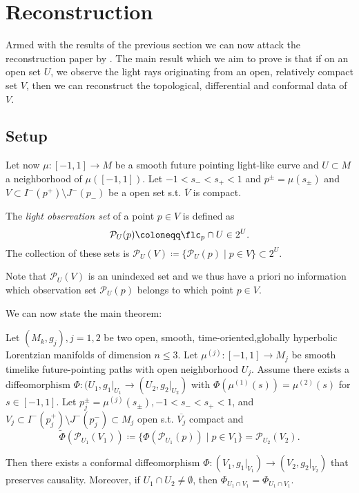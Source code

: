 \section{Reconstruction}
Armed with the results of the previous section we can now attack the reconstruction paper by \citet{kurylev2017inverse}.
The main result which we aim to prove is that if on an open set $U$, we observe the light rays originating from an open, relatively compact set $V$, then we can reconstruct the topological, differential and conformal data of $V$.

\subsection{Setup}
Let now $\mu:[-1,1]\to M$ be a smooth future pointing light-like curve and $U\subset M$ a neighborhood of $\mu([-1,1])$. Let $-1<s_-<s_+<1$ and $p^\pm=\mu(s_\pm)$ and $V\subset I^-(p^+)\setminus J^-(p_-)$ be a open set s.t. $\overline{V}$ is compact.

\begin{definition}
The \emph{light observation set} of a point $p\in V$ is defined as
\[
\mathcal{P}_U(p) \coloneqq \flc_p \cap U \in 2^U.
\]
The collection of these sets is $\mathcal{P}_U(V)\coloneqq\{\mathcal{P}_U(p)\mid p\in V\}\subset 2^U$.
\end{definition}
Note that $\mathcal{P}_U(V)$ is an unindexed set and we thus have a priori no information which observation set $\mathcal{P}_U(p)$ belongs to which point $p\in V$.


We can now state the main theorem:
\begin{theorem}\label{thm:reconstr}
Let $(M_k,g_j),j=1,2$ be two open, smooth, time-oriented,globally hyperbolic Lorentzian manifolds of dimension $n\leq3$. Let $\mu^{(j)}:[-1,1]\to M_j$ be smooth timelike future-pointing paths with open neighborhood $U_j$. Assume there exists a diffeomorphism $\Phi:(U_1,g_1\rvert_{U_1}\to(U_2,g_2\rvert_{U_2})$ with $\Phi(\mu^{(1)}(s))=\mu^{(2)}(s)$ for $s\in [-1,1]$. Let $p_j^\pm=\mu^{(j)}(s_\pm), -1<s_-<s_+<1$, and $V_j \subset I^-(p_j^+)\setminus J^-(p_j^-) \subset M_j$ open s.t. $\overline{V_j}$ compact and 
\begin{equation}\label{eq:conformalobservation}
\widetilde{\Phi}(\mathcal{P}_{U_1}(V_1))\coloneqq\{\Phi(\mathcal{P}_{U_1}(p))\mid p\in V_1\} = \mathcal{P}_{U_2}(V_2).
\end{equation}

Then there exists a conformal diffeomorphism $\Phi:(V_1,g_1\rvert_{V_1})\to(V_2,g_2\rvert_{V_2})$ that preserves causality. Moreover, if $U_1\cap U_2\neq \emptyset$, then $\Phi_{U_1\cap V_1} = \Phi_{U_1\cap V_1}$.
\end{theorem}


